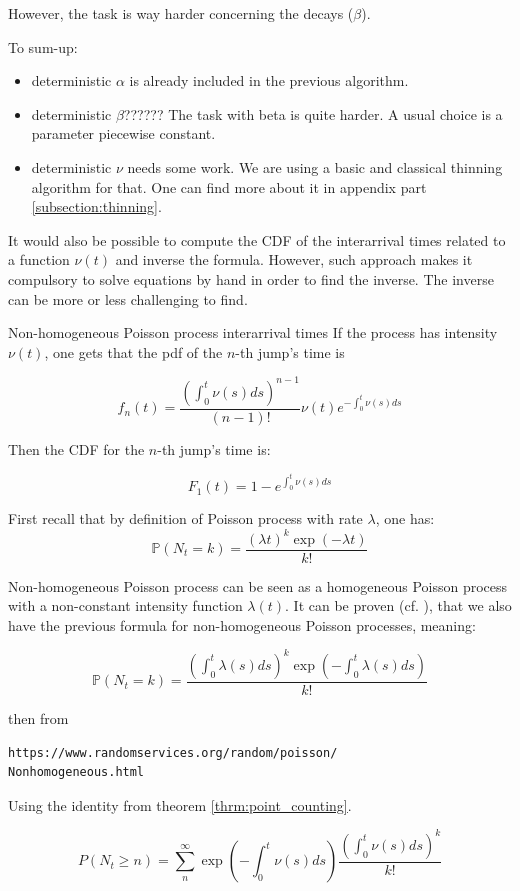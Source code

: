 \documentclass[11pt]{book}
\begin{document}
However, the task is way harder concerning the decays ($\beta$).

To sum-up:
\begin{itemize}
\item deterministic $\alpha$ is already included in the previous algorithm.
\item deterministic $\beta$??????  The task with beta is quite harder. A usual choice is a parameter piecewise constant. 
\item deterministic $\nu$ needs some work. We are using a basic and classical thinning algorithm for that. One can find more about it in appendix part \ref{subsection:thinning}.
\end{itemize}





It would also be possible to compute the CDF of the interarrival times related to a function $\nu(t)$ and inverse the formula. However, such approach makes it compulsory to solve equations by hand in order to find the inverse. The inverse can be more or less challenging to find. 


\begin{theoreme}{Non-homogeneous Poisson process interarrival times}
If the process has intensity $\nu(t)$, one gets that the pdf of the $n$-th jump's time is 

$$
f_n(t)  = \frac {\left ( \int_0^t \nu(s) ds \right )^{n-1}}{(n-1)!} \nu(t) e^{-  \int_0^t \nu(s) ds }
$$

Then the CDF for the $n$-th jump's time is:

$$
F_1(t) = 1 - e^{  \int_0^t \nu(s) ds } 
$$

\end{theoreme}


\begin{demo}{}{}
First recall that by definition of Poisson process with rate $\lambda$, one has:
$$
\mathbb P(N_t = k) = \frac { (\lambda t)^k \exp(- \lambda t ) }{k !}$$

Non-homogeneous Poisson process can be seen as a homogeneous Poisson process with a non-constant intensity function $\lambda (t)$. It can be proven (cf. \cite{Veraart}), that we also have the previous formula for non-homogeneous Poisson processes, meaning:

$$
\mathbb P(N_t = k) = \frac { \left ( \int_0^t \lambda(s) ds \right )^k \exp \left ( - \int_0^t \lambda(s) ds \right )  }{k !}$$

then from \begin{verbatim}
https://www.randomservices.org/random/poisson/
Nonhomogeneous.html
\end{verbatim}

Using the identity from theorem \ref{thrm:point_counting}.

$$ P( N_t \geq n ) = \sum_n^{\infty} \exp \left ( - \int_0^t \nu(s) ds \right ) \frac{ \left ( \int_0^t \nu(s) ds \right ) ^k }{k !} 
$$
\end{demo}
\end{document}
